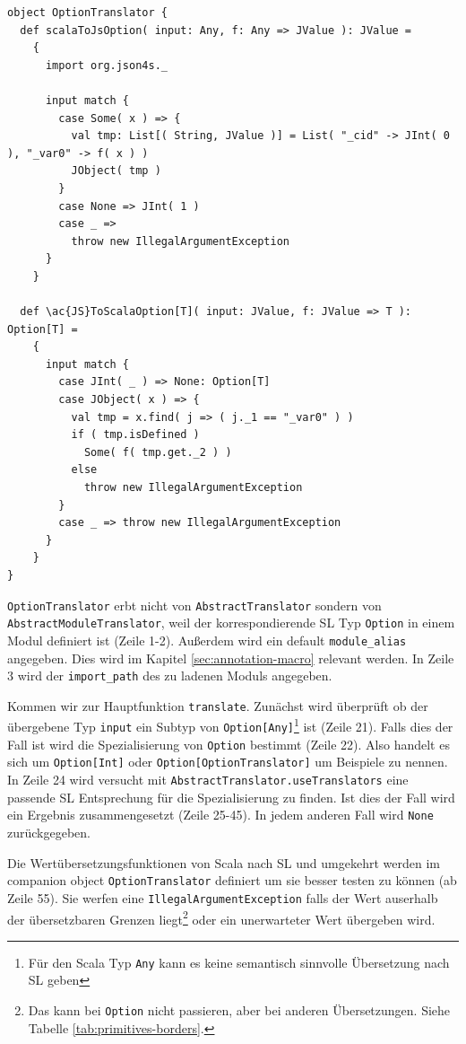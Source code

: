 \documentclass[12pt]{scrreprt}
\begin{document}
\begin{lstlisting}[caption=Source Code von OptionTranslator, label=lst:source option translator]
object OptionTranslator {
  def scalaToJsOption( input: Any, f: Any => JValue ): JValue =
    {
      import org.json4s._

      input match {
        case Some( x ) => {
          val tmp: List[( String, JValue )] = List( "_cid" -> JInt( 0 ), "_var0" -> f( x ) )
          JObject( tmp )
        }
        case None => JInt( 1 )
        case _ =>
          throw new IllegalArgumentException
      }
    }

  def \ac{JS}ToScalaOption[T]( input: JValue, f: JValue => T ): Option[T] =
    {
      input match {
        case JInt( _ ) => None: Option[T]
        case JObject( x ) => {
          val tmp = x.find( j => ( j._1 == "_var0" ) )
          if ( tmp.isDefined )
            Some( f( tmp.get._2 ) )
          else
            throw new IllegalArgumentException
        }
        case _ => throw new IllegalArgumentException
      }
    }
}

\end{lstlisting}

\lstinline!OptionTranslator! erbt nicht von \lstinline!AbstractTranslator! sondern von \lstinline!AbstractModuleTranslator!, weil der korrespondierende \ac{SL} Typ \lstinline!Option! in einem Modul definiert ist (Zeile 1-2). Außerdem wird ein default \lstinline!module_alias! angegeben. Dies wird im Kapitel \ref{sec:annotation-macro} relevant werden. In Zeile 3 wird der \lstinline!import_path! des zu ladenen Moduls angegeben. 

Kommen wir zur Hauptfunktion \lstinline!translate!. Zunächst wird überprüft ob der übergebene Typ \lstinline!input! ein Subtyp von \lstinline!Option[Any]!\footnote{Für den Scala Typ \lstinline!Any! kann es keine semantisch sinnvolle Übersetzung nach \ac{SL} geben} ist (Zeile 21). Falls dies der Fall ist wird die Spezialisierung von \lstinline!Option! bestimmt (Zeile 22). Also handelt es sich um \lstinline!Option[Int]! oder \lstinline!Option[OptionTranslator]! um Beispiele zu nennen. In Zeile 24 wird versucht mit \lstinline!AbstractTranslator.useTranslators! eine passende \ac{SL} Entsprechung für die Spezialisierung zu finden. Ist dies der Fall wird ein Ergebnis zusammengesetzt (Zeile 25-45). In jedem anderen Fall wird \lstinline!None! zurückgegeben.

Die Wertübersetzungsfunktionen von Scala nach \ac{SL} und umgekehrt werden im companion object \lstinline!OptionTranslator! definiert um sie besser testen zu können (ab Zeile 55). Sie werfen eine \lstinline!IllegalArgumentException! falls der Wert auserhalb der übersetzbaren Grenzen liegt\footnote{Das kann bei \lstinline!Option! nicht passieren, aber bei anderen Übersetzungen. Siehe Tabelle \ref{tab:primitives-borders}.} oder ein unerwarteter Wert übergeben wird.
\end{document}
